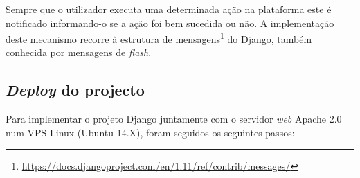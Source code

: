 Sempre que o utilizador executa uma determinada ação na plataforma este é notificado informando-o se a ação foi bem sucedida ou não. A implementação deste mecanismo recorre à estrutura de mensagens\footnote{\url{https://docs.djangoproject.com/en/1.11/ref/contrib/messages/}} do Django, também conhecida por mensagens de \textit{flash}. 




\subsection{\textit{Deploy} do projecto}

Para implementar o projeto Django juntamente com o servidor \textit{web} Apache 2.0 num \ac{VPS} Linux (Ubuntu 14.X), foram seguidos os seguintes passos: 






